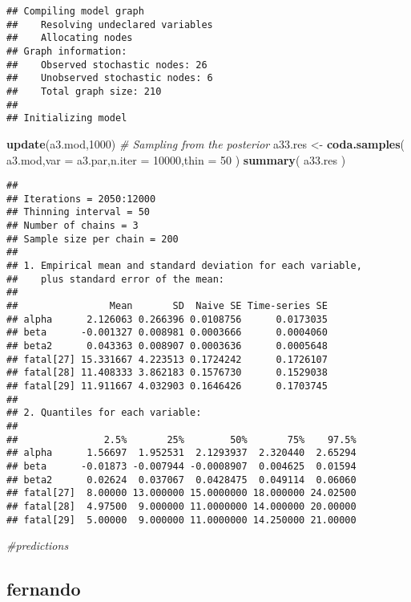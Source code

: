 \documentclass[]{article}
\newenvironment{Shaded}{\begin{snugshade}}{\end{snugshade}}
\newcommand{\KeywordTok}[1]{\textcolor[rgb]{0.13,0.29,0.53}{\textbf{#1}}}
\newcommand{\DataTypeTok}[1]{\textcolor[rgb]{0.13,0.29,0.53}{#1}}
\newcommand{\DecValTok}[1]{\textcolor[rgb]{0.00,0.00,0.81}{#1}}
\newcommand{\StringTok}[1]{\textcolor[rgb]{0.31,0.60,0.02}{#1}}
\newcommand{\CommentTok}[1]{\textcolor[rgb]{0.56,0.35,0.01}{\textit{#1}}}
\newcommand{\NormalTok}[1]{#1}
\begin{document}
\begin{verbatim}
## Compiling model graph
##    Resolving undeclared variables
##    Allocating nodes
## Graph information:
##    Observed stochastic nodes: 26
##    Unobserved stochastic nodes: 6
##    Total graph size: 210
## 
## Initializing model
\end{verbatim}

\begin{Shaded}
\begin{Highlighting}[]
 \KeywordTok{update}\NormalTok{(a3.mod,}\DecValTok{1000}\NormalTok{)}
 \CommentTok{# Sampling from the posterior}
\NormalTok{ a33.res <-}\StringTok{ }\KeywordTok{coda.samples}\NormalTok{( a3.mod,}\DataTypeTok{var =}\NormalTok{ a3.par,}\DataTypeTok{n.iter =} \DecValTok{10000}\NormalTok{,}\DataTypeTok{thin =} \DecValTok{50}\NormalTok{ )}
 \KeywordTok{summary}\NormalTok{( a33.res )}
\end{Highlighting}
\end{Shaded}

\begin{verbatim}
## 
## Iterations = 2050:12000
## Thinning interval = 50 
## Number of chains = 3 
## Sample size per chain = 200 
## 
## 1. Empirical mean and standard deviation for each variable,
##    plus standard error of the mean:
## 
##                Mean       SD  Naive SE Time-series SE
## alpha      2.126063 0.266396 0.0108756      0.0173035
## beta      -0.001327 0.008981 0.0003666      0.0004060
## beta2      0.043363 0.008907 0.0003636      0.0005648
## fatal[27] 15.331667 4.223513 0.1724242      0.1726107
## fatal[28] 11.408333 3.862183 0.1576730      0.1529038
## fatal[29] 11.911667 4.032903 0.1646426      0.1703745
## 
## 2. Quantiles for each variable:
## 
##               2.5%       25%        50%       75%    97.5%
## alpha      1.56697  1.952531  2.1293937  2.320440  2.65294
## beta      -0.01873 -0.007944 -0.0008907  0.004625  0.01594
## beta2      0.02624  0.037067  0.0428475  0.049114  0.06060
## fatal[27]  8.00000 13.000000 15.0000000 18.000000 24.02500
## fatal[28]  4.97500  9.000000 11.0000000 14.000000 20.00000
## fatal[29]  5.00000  9.000000 11.0000000 14.250000 21.00000
\end{verbatim}

\begin{Shaded}
\begin{Highlighting}[]
 \CommentTok{#predictions}
\end{Highlighting}
\end{Shaded}

\subsection{fernando}\label{fernando}
\end{document}
